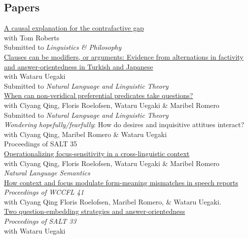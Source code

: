 \documentclass[11pt, a4paper]{article} %
\newcommand{\years}[1]{\marginnote{\scriptsize #1}} %
\begin{document}
\subsection*{Papers}
\years{in~prep} 
\href{https://ling.auf.net/lingbuzz/009050}{A causal explanation for the contrafactive gap} \\
with Tom Roberts \\
Submitted to \emph{Linguistics \& Philosophy} \\[.25em]
\href{https://ling.auf.net/lingbuzz/008187}{Clauses can be modifiers, or arguments: Evidence from
alternations in factivity and answer-orientedness in Turkish and Japanese} \\
with Wataru Uegaki  \\
Submitted to \emph{Natural Language and Linguistic Theory} \\[.25em]
\href{https://ling.auf.net/lingbuzz/008113}{When can non-veridical preferential predicates take questions?} \\
with Ciyang Qing, Floris Roelofsen, Wataru Uegaki \& Maribel Romero \\
Submitted to \emph{Natural Language and Linguistic Theory} \\[.25em]
\years{to appear}
\emph{Wondering hopefully/fearfully}: How do desires and
inquisitive attitues interact? \\
with Ciyang Qing, Maribel Romero \& Wataru Uegaki \\
Proceedings of SALT 35\\[.25em]
\years{2025} 
\href{https://link.springer.com/article/10.1007/s11050-025-09243-w}{Operationalizing focus-sensitivity in a cross-linguistic context} \\ 
with Ciyang Qing, Floris Roelofsen, Wataru Uegaki \& Maribel Romero \\
\emph{Natural Language Semantics} \\[.25em]
\href{http://www.lingref.com/cpp/wccfl/41/paper3783.pdf}{How context and focus modulate form-meaning mismatches in speech
reports} \\
\emph{Proceedings of WCCFL 41} \\
with Ciyang Qing Floris Roelofsen, Maribel Romero, \& Wataru Uegaki. \\[.25em]
\years{2023} \href{https://osf.io/preprints/psyarxiv/dbh4z/}{Two question-embedding strategies and
answer-oriented\-ness} \\
\emph{Proceedings of SALT 33} \\
with Wataru Uegaki \\[.25em]
\end{document}
